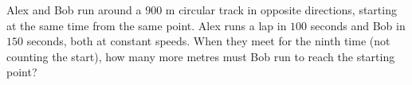 Alex and Bob run around a $900$ m circular track in opposite directions, starting at the same time from the same point. Alex runs a lap in $100$ seconds and Bob in $150$ seconds, both at constant speeds. When they meet for the ninth time (not counting the start), how many more metres must Bob run to reach the starting point?
